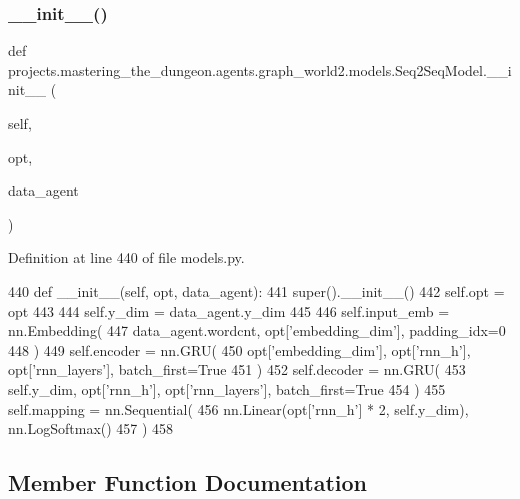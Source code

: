 \subsubsection{\texorpdfstring{\+\_\+\+\_\+init\+\_\+\+\_\+()}{\_\_init\_\_()}}
{\footnotesize\ttfamily def projects.\+mastering\+\_\+the\+\_\+dungeon.\+agents.\+graph\+\_\+world2.\+models.\+Seq2\+Seq\+Model.\+\_\+\+\_\+init\+\_\+\+\_\+ (\begin{DoxyParamCaption}\item[{}]{self,  }\item[{}]{opt,  }\item[{}]{data\+\_\+agent }\end{DoxyParamCaption})}



Definition at line 440 of file models.\+py.


\begin{DoxyCode}
440     \textcolor{keyword}{def }\_\_init\_\_(self, opt, data\_agent):
441         super().\_\_init\_\_()
442         self.opt = opt
443 
444         self.y\_dim = data\_agent.y\_dim
445 
446         self.input\_emb = nn.Embedding(
447             data\_agent.wordcnt, opt[\textcolor{stringliteral}{'embedding\_dim'}], padding\_idx=0
448         )
449         self.encoder = nn.GRU(
450             opt[\textcolor{stringliteral}{'embedding\_dim'}], opt[\textcolor{stringliteral}{'rnn\_h'}], opt[\textcolor{stringliteral}{'rnn\_layers'}], batch\_first=\textcolor{keyword}{True}
451         )
452         self.decoder = nn.GRU(
453             self.y\_dim, opt[\textcolor{stringliteral}{'rnn\_h'}], opt[\textcolor{stringliteral}{'rnn\_layers'}], batch\_first=\textcolor{keyword}{True}
454         )
455         self.mapping = nn.Sequential(
456             nn.Linear(opt[\textcolor{stringliteral}{'rnn\_h'}] * 2, self.y\_dim), nn.LogSoftmax()
457         )
458 
\end{DoxyCode}


\subsection{Member Function Documentation}
\mbox{\label{classprojects_1_1mastering__the__dungeon_1_1agents_1_1graph__world2_1_1models_1_1Seq2SeqModel_a643150fe7784a20ac0ed2e76ca9fc10a}} 
